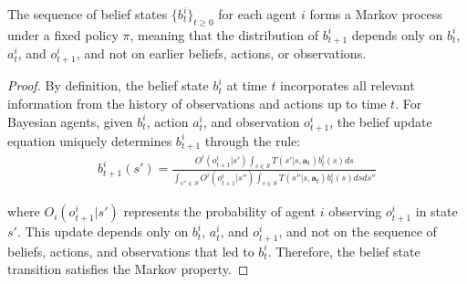 \begin{lemma}
    The sequence of belief states $\{b_{t}^{i}\}_{t \geq 0}$ for each agent $i$ forms
    a Markov process under a fixed policy $\pi$, meaning that the distribution of
    $b_{t+1}^{i}$ depends only on $b_{t}^{i}$, $a_{t}^{i}$, and $o_{t+1}^{i}$, and
    not on earlier beliefs, actions, or observations.
\end{lemma}

\begin{proof}
    By definition, the belief state $b_{t}^{i}$ at time $t$ incorporates all
    relevant information from the history of observations and actions up to time
    $t$. For Bayesian agents, given $b_{t}^{i}$, action $a_{t}^{i}$, and
    observation $o_{t+1}^{i}$, the belief update equation uniquely determines $b_{t+1}
            ^{i}$ through the rule:
    \begin{align}
        b^i_{t+1}(s') = \frac{O^i(o^i_{t+1}|s') \int_{s \in S} T(s'|s, \boldsymbol{a}_t) b^i_t(s) ds}{\int_{s'' \in S} O^i(o^i_{t+1}|s'') \int_{s \in S} T(s''|s, \boldsymbol{a}_t) b^i_t(s) ds ds''}
    \end{align}

    where $O_{i}(o_{t+1}^{i}|s')$ represents the probability of agent $i$ observing
    $o_{t+1}^{i}$ in state $s'$. This update depends only on $b_{t}^{i}$, $a_{t}^{i}$,
    and $o_{t+1}^{i}$, and not on the sequence of beliefs, actions, and observations
    that led to $b_{t}^{i}$. Therefore, the belief state transition satisfies the Markov
    property.
\end{proof}

